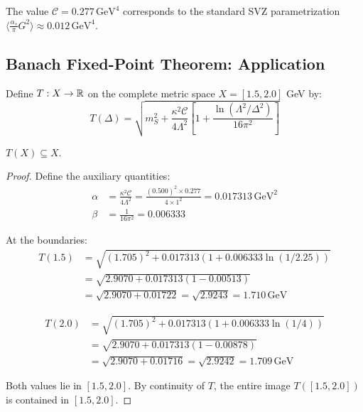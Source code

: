 \begin{remark}
The value $\mathcal{C} = 0.277\,\mathrm{GeV}^4$ corresponds to the 
standard SVZ parametrization $\langle\frac{\alpha_s}{\pi}G^2\rangle \approx 0.012\,\mathrm{GeV}^4$.
\end{remark}

\subsection{Banach Fixed-Point Theorem: Application}

\begin{definition}
Define $T: X \to \mathbb{R}$ on the complete metric space $X = [1.5, 2.0]$ GeV by:
\begin{equation}
T(\Delta) = \sqrt{m_S^2 + \frac{\kappa^2\mathcal{C}}{4\Lambda^2}
\left[1 + \frac{\ln(\Lambda^2/\Delta^2)}{16\pi^2}\right]}
\label{eq:T_map_app}
\end{equation}
\end{definition}

\begin{lemma}
\label{lem:self_mapping_app}
$T(X) \subseteq X$.
\end{lemma}

\begin{proof}
Define the auxiliary quantities:
\begin{align}
\alpha &= \frac{\kappa^2\mathcal{C}}{4\Lambda^2} 
= \frac{(0.500)^2 \times 0.277}{4 \times 1^2} = 0.017313\,\mathrm{GeV}^2 \\
\beta &= \frac{1}{16\pi^2} = 0.006333
\end{align}

At the boundaries:
\begin{align}
T(1.5) &= \sqrt{(1.705)^2 + 0.017313(1 + 0.006333\ln(1/2.25))} \\
&= \sqrt{2.9070 + 0.017313(1 - 0.00513)} \\
&= \sqrt{2.9070 + 0.01722} = \sqrt{2.9243} = 1.710\,\mathrm{GeV}
\end{align}

\begin{align}
T(2.0) &= \sqrt{(1.705)^2 + 0.017313(1 + 0.006333\ln(1/4))} \\
&= \sqrt{2.9070 + 0.017313(1 - 0.00878)} \\
&= \sqrt{2.9070 + 0.01716} = \sqrt{2.9242} = 1.709\,\mathrm{GeV}
\end{align}

Both values lie in $[1.5, 2.0]$. By continuity of $T$, the entire image 
$T([1.5, 2.0])$ is contained in $[1.5, 2.0]$.
\end{proof}

